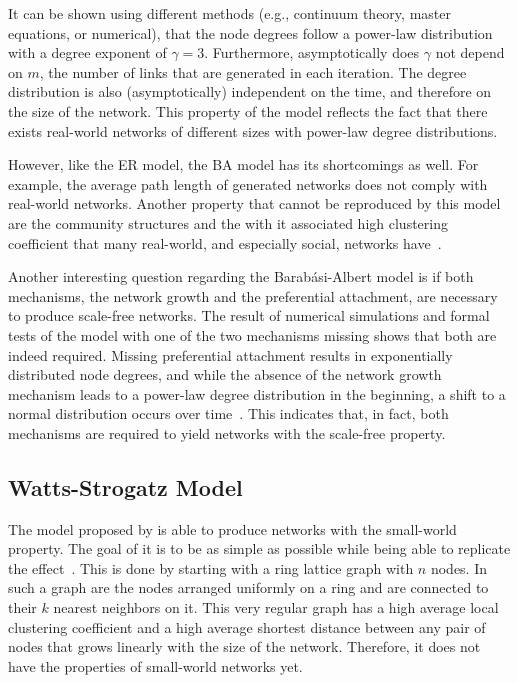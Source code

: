 It can be shown using different methods (e.g., continuum theory, master equations, or numerical), that the node degrees follow a power-law distribution with a degree exponent of \( \gamma = 3 \).
Furthermore, asymptotically does \( \gamma \) not depend on \( m \), the number of links that are generated in each iteration.
The degree distribution is also (asymptotically) independent on the time, and therefore on the size of the network.
This property of the model reflects the fact that there exists real-world networks of different sizes with power-law degree distributions.

However, like the ER model, the BA model has its shortcomings as well.
For example, the average path length of generated networks does not comply with real-world networks.
Another property that cannot be reproduced by this model are the community structures and the with it associated high clustering coefficient that many real-world, and especially social, networks have~\cite{Reid2011}.

Another interesting question regarding the Barabási-Albert model is if both mechanisms, the network growth and the preferential attachment, are necessary to produce scale-free networks.
The result of numerical simulations and formal tests of the model with one of the two mechanisms missing shows that both are indeed required.
Missing preferential attachment results in exponentially distributed node degrees, and while the absence of the network growth mechanism leads to a power-law degree distribution in the beginning, a shift to a normal distribution occurs over time~\cite{Barabasi2002}.
This indicates that, in fact, both mechanisms are required to yield networks with the scale-free property.


\subsection{Watts-Strogatz Model}
\label{subsec:watts-strogatz-model}

The model proposed by \citet{Watts1998} is able to produce networks with the small-world property.
The goal of it is to be as simple as possible while being able to replicate the effect~\cite{Watts2004}.
This is done by starting with a ring lattice graph with \( n \) nodes.
In such a graph are the nodes arranged uniformly on a ring and are connected to their \( k \) nearest neighbors on it.
This very regular graph has a high average local clustering coefficient and a high average shortest distance between any pair of nodes that grows linearly with the size of the network.
Therefore, it does not have the properties of small-world networks yet.

